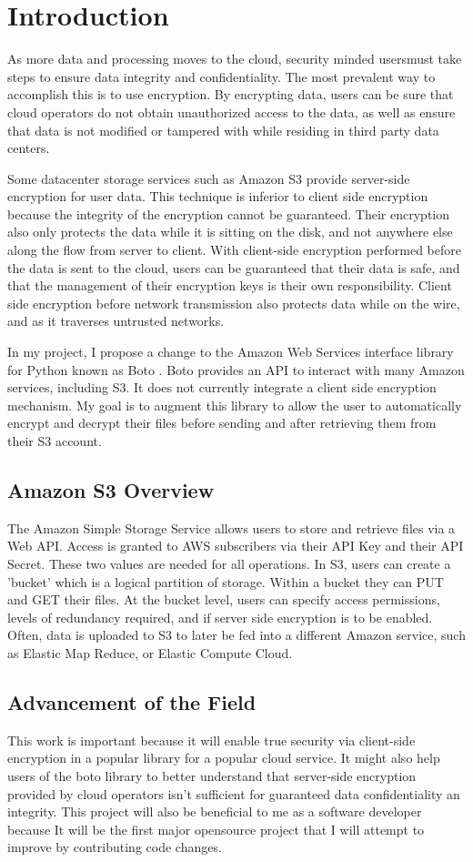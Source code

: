 \section{Introduction}
As more data and processing moves to the cloud, security minded usersmust take steps to ensure data integrity and confidentiality.
The most prevalent way to accomplish this is to use encryption. 
By encrypting data, users can be sure that cloud operators do not
obtain unauthorized access to the data, as well as ensure that data is not modified or tampered with while residing in third party data centers.

Some datacenter storage services such as Amazon S3 \cite{amazons3} provide server-side encryption for user data. This technique is inferior to client side encryption because the integrity of the encryption cannot be guaranteed.
Their encryption also only protects the data while it is sitting on the disk, and not anywhere else along the flow from server to client.
With client-side encryption performed before the data is sent to the cloud, users can be guaranteed that their data is safe, and that the management of their encryption keys is their own responsibility. 
Client side encryption before network transmission also protects data while on the wire, and as it traverses untrusted networks.

In my project, I propose a change to the Amazon Web Services interface library for Python known as Boto \cite{boto}. Boto provides an API to interact with many Amazon services, including S3. It does not currently integrate a client side encryption mechanism. My goal is to augment this library to allow the user to automatically encrypt and decrypt their files before sending and after retrieving them from their S3 account.

\subsection{Amazon S3 Overview}
The Amazon Simple Storage Service allows users to store and retrieve files via a Web API. Access is granted to AWS subscribers via their API Key and their API Secret. These two values are needed for all operations. In S3, users can create a 'bucket' which is a logical partition of storage. Within a bucket they can PUT and GET their files. At the bucket level, users can specify access permissions, levels of redundancy required, and if server side encryption is to be enabled. Often, data is uploaded to S3 to later be fed into a different Amazon service, such as Elastic Map Reduce, or Elastic Compute Cloud.

\subsection{Advancement of the Field}
This work is important because it will enable true security via client-side encryption in a popular library for a popular cloud service.
It might also help users of the boto library to better understand that server-side encryption provided by cloud operators isn't sufficient for guaranteed data confidentiality an integrity.
This project will also be beneficial to me as a software developer because It will be the first major opensource project that I will attempt to improve by contributing code changes.
